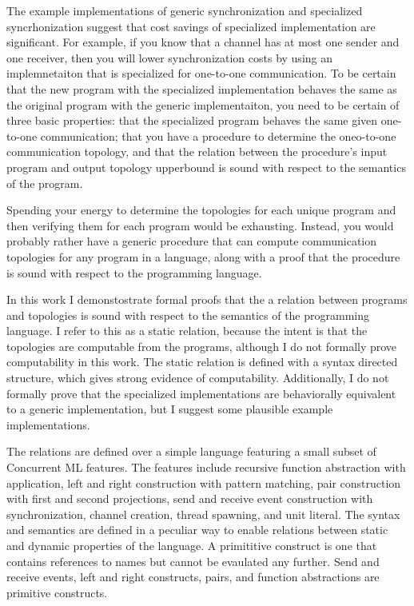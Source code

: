 \documentclass{article}
\begin{document}
The example implementations of generic synchronization and specialized syncrhonization suggest that cost savings of specialized
implementation are significant.  For example, if you know that a channel has at most one sender and one receiver, then you will
lower synchronization costs by using an implemnetaiton that is specialized for one-to-one communication.  To be certain that the
new program with the specialized implementation behaves the same as the original program with the generic implementaiton, you need
to be certain of three basic properties: that the specialized program behaves the same given one-to-one communication; that you
have a procedure to determine the oneo-to-one communication topology, and that the relation between the procedure's input program
and output topology upperbound is sound with respect to the semantics of the program.  

Spending your energy to determine the topologies for each unique
program and then verifying them for each program would be exhausting. Instead, you would probably rather have a generic procedure
that can compute communication topologies for any program in a language, along with a proof that the procedure is sound with
respect to the programming language.

In this work I demonstostrate formal proofs that the a relation between programs and topologies is sound with respect to the
semantics of the programming language.  I refer to this as a static relation, because the intent is that the topologies are
computable from the programs, although I do not formally prove computability in this work.  The static relation is defined with a
syntax directed structure, which gives strong evidence of computability.  Additionally, I do not formally prove that the specialized
implementations are behaviorally equivalent to a generic implementation, but I suggest some plausible example implementations.

The relations are defined over a simple language featuring a small subset of Concurrent ML features.  The features include
recursive function abstraction with application, left and right construction with pattern matching, pair construction with first
and second projections, send and receive event construction with synchronization, channel creation, thread spawning, and unit
literal.  The syntax and semantics are defined in a peculiar way to enable relations between static and dynamic properties of the
language.  A primititive construct is one that contains references to names but cannot be evaulated any further. Send and receive events, left and right constructs, pairs, and function abstractions are primitive constructs.
\end{document}

